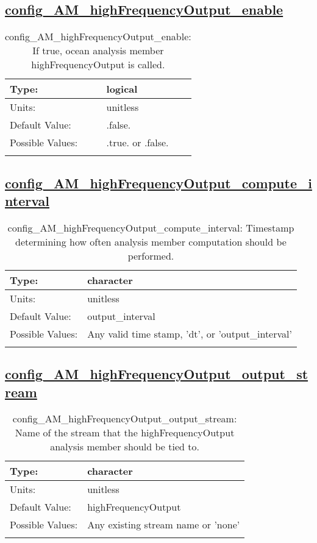 \subsection[config\_AM\_highFrequencyOutput\_enable]{\hyperref[sec:nm_tab_AM_highFrequencyOutput]{config\_AM\_highFrequencyOutput\_enable}}
\label{subsec:nm_sec_config_AM_highFrequencyOutput_enable}
\begin{center}
\begin{longtable}{| p{2.0in} || p{4.0in} |}
    \hline
    Type: & logical \\
    \hline
    Units: & \si{unitless} \\
    \hline
    Default Value: & .false. \\
    \hline
    Possible Values: & .true. or .false. \\
    \hline
    \caption{config\_AM\_highFrequencyOutput\_enable: If true, ocean analysis member highFrequencyOutput is called.}
\end{longtable}
\end{center}
\subsection[config\_AM\_highFrequencyOutput\_compute\_interval]{\hyperref[sec:nm_tab_AM_highFrequencyOutput]{config\_AM\_highFrequencyOutput\_compute\_interval}}
\label{subsec:nm_sec_config_AM_highFrequencyOutput_compute_interval}
\begin{center}
\begin{longtable}{| p{2.0in} || p{4.0in} |}
    \hline
    Type: & character \\
    \hline
    Units: & \si{unitless} \\
    \hline
    Default Value: & output\_interval \\
    \hline
    Possible Values: & Any valid time stamp, 'dt', or 'output\_interval' \\
    \hline
    \caption{config\_AM\_highFrequencyOutput\_compute\_interval: Timestamp determining how often analysis member computation should be performed.}
\end{longtable}
\end{center}
\subsection[config\_AM\_highFrequencyOutput\_output\_stream]{\hyperref[sec:nm_tab_AM_highFrequencyOutput]{config\_AM\_highFrequencyOutput\_output\_stream}}
\label{subsec:nm_sec_config_AM_highFrequencyOutput_output_stream}
\begin{center}
\begin{longtable}{| p{2.0in} || p{4.0in} |}
    \hline
    Type: & character \\
    \hline
    Units: & \si{unitless} \\
    \hline
    Default Value: & highFrequencyOutput \\
    \hline
    Possible Values: & Any existing stream name or 'none' \\
    \hline
    \caption{config\_AM\_highFrequencyOutput\_output\_stream: Name of the stream that the highFrequencyOutput analysis member should be tied to.}
\end{longtable}
\end{center}

